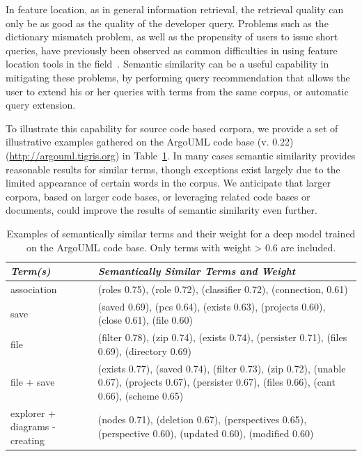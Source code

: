 In feature location, as in general information retrieval, the
retrieval quality can only be as good as the quality of the developer
query. Problems such as the dictionary mismatch problem, as well as
the propensity of users to issue short queries, have previously been
observed as common difficulties in using feature location tools in the
field~\cite{haiduc_effect_2011, damevski_field_2015}. Semantic
similarity can be a useful capability in mitigating these problems, by
performing query recommendation that allows the user to extend his or
her queries with terms from the same corpus, or automatic query
extension.

To illustrate this capability for source code based corpora, we
provide a set of illustrative examples gathered on the ArgoUML code
base (v. 0.22) (\url{http://argouml.tigris.org}) in
Table~\ref{tab:semsim}. In many cases semantic similarity provides
reasonable results for similar terms, though exceptions exist largely
due to the limited appearance of certain words in the corpus.  We
anticipate that larger corpora, based on larger code bases, or
leveraging related code bases or documents, could improve the results
of semantic similarity even further.


\begin{table}[t]
\centering
\small
\caption{Examples of semantically similar terms and their weight for a deep model trained on
the ArgoUML code base. Only terms with weight > 0.6 are included.}
\label{tab:semsim}
\begin{tabular}{|p{}|p{}|}
\hline \hline 
{\em Term(s)} & {\em Semantically Similar Terms and Weight}\\ \hline \hline 
association & (roles 0.75), (role 0.72), (classifier 0.72), (connection, 0.61) \\ \hline
save & (saved 0.69), (pcs 0.64), (exists 0.63), (projects 0.60), (close 0.61), (file 0.60) \\ \hline
file & (filter 0.78), (zip 0.74), (exists 0.74), (persister 0.71), (files 0.69), (directory 0.69) \\ \hline
file + save & (exists 0.77), (saved 0.74), (filter 0.73), (zip 0.72), (unable 0.67), (projects 0.67), (persister 0.67), (files 0.66), (cant 0.66), (scheme 0.65) \\ \hline
explorer + diagrams - creating & (nodes 0.71), (deletion 0.67), (perspectives 0.65), (perspective 0.60), (updated 0.60), (modified 0.60)\\
\hline \hline
\end{tabular}
\end{table}

